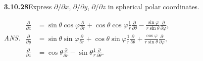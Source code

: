 \par\bigskip
\noindent\textbf{3.10.28}\quad Express $\partial/\partial x$,
$\partial/\partial y$, $\partial/\partial z$ in spherical polar coordinates.
\par\nobreak\hfill\emph{ANS.}\enspace
$\begin{aligned}
\frac{\partial}{\partial x}&=\sin\theta\cos\varphi\frac{\partial}{\partial r}
+\cos\theta\cos\varphi\frac{1}{r}\frac{\partial}{\partial\theta}
-\frac{\sin\varphi}{r\sin\theta}\frac{\partial}{\partial\varphi},\\
\frac{\partial}{\partial y}&=\sin\theta\sin\varphi\frac{\partial}{\partial r}
+\cos\theta\sin\varphi\frac{1}{r}\frac{\partial}{\partial\theta}
+\frac{\cos\varphi}{r\sin\theta}\frac{\partial}{\partial\varphi},\\
\frac{\partial}{\partial z}&=\cos\theta\frac{\partial}{\partial r}
-\sin\theta\frac{1}{r}\frac{\partial}{\partial\theta}.
\end{aligned}$

